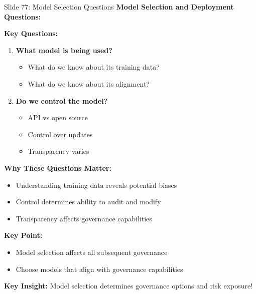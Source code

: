 \documentclass[8pt]{beamer}
\begin{document}
	\begin{frame}{Slide 77: Model Selection Questions}
		\fontsize{6.5}{7.5}\selectfont
		\textbf{Model Selection and Deployment Questions:}
		
		\vspace{0.1cm}
		\textbf{Key Questions:}
		\begin{enumerate}
			\item \textbf{What model is being used?}
			\begin{itemize}
				\item What do we know about its training data?
				\item What do we know about its alignment?
			\end{itemize}
			\item \textbf{Do we control the model?}
			\begin{itemize}
				\item API vs open source
				\item Control over updates
				\item Transparency varies
			\end{itemize}
		\end{enumerate}
		
		\vspace{0.1cm}
		\textbf{Why These Questions Matter:}
		\begin{itemize}
			\item Understanding training data reveals potential biases
			\item Control determines ability to audit and modify
			\item Transparency affects governance capabilities
		\end{itemize}
		
		\vspace{0.1cm}
		\textbf{Key Point:}
		\begin{itemize}
			\item Model selection affects all subsequent governance
			\item Choose models that align with governance capabilities
		\end{itemize}
		
		\textcolor{myblue}{\textbf{Key Insight:}} Model selection determines \textcolor{myblue}{governance options and risk exposure}!
	\end{frame}
	
\end{document}
